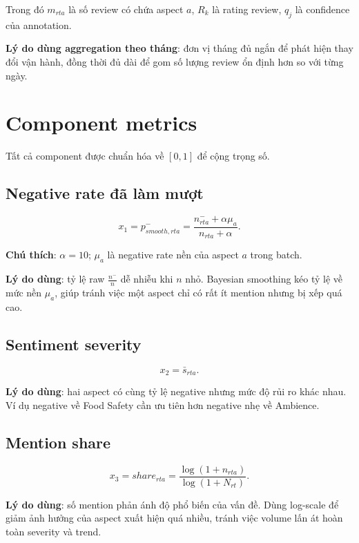 \documentclass[12pt,a4paper]{article}
\begin{document}
Trong đó $m_{rta}$ là số review có chứa aspect $a$, $R_k$ là rating review, $q_j$ là confidence của annotation.

\textbf{Lý do dùng aggregation theo tháng}: đơn vị tháng đủ ngắn để phát hiện thay đổi vận hành, đồng thời đủ dài để gom số lượng review ổn định hơn so với từng ngày.

\section{Component metrics}

Tất cả component được chuẩn hóa về $[0,1]$ để cộng trọng số.

\subsection{Negative rate đã làm mượt}

\begin{equation}
x_1 = p^{-}_{smooth,rta}
= \frac{n^{-}_{rta}+\alpha\mu_a}{n_{rta}+\alpha}.
\end{equation}

\textbf{Chú thích}: $\alpha=10$; $\mu_a$ là negative rate nền của aspect $a$ trong batch.

\textbf{Lý do dùng}: tỷ lệ raw $\frac{n^-}{n}$ dễ nhiễu khi $n$ nhỏ. Bayesian smoothing kéo tỷ lệ về mức nền $\mu_a$, giúp tránh việc một aspect chỉ có rất ít mention nhưng bị xếp quá cao.

\subsection{Sentiment severity}

\begin{equation}
x_2 = \bar{s}_{rta}.
\end{equation}

\textbf{Lý do dùng}: hai aspect có cùng tỷ lệ negative nhưng mức độ rủi ro khác nhau. Ví dụ negative về Food Safety cần ưu tiên hơn negative nhẹ về Ambience.

\subsection{Mention share}

\begin{equation}
x_3 = share_{rta}
= \frac{\log(1+n_{rta})}{\log(1+N_{rt})}.
\end{equation}

\textbf{Lý do dùng}: số mention phản ánh độ phổ biến của vấn đề. Dùng log-scale để giảm ảnh hưởng của aspect xuất hiện quá nhiều, tránh việc volume lấn át hoàn toàn severity và trend.
\end{document}
